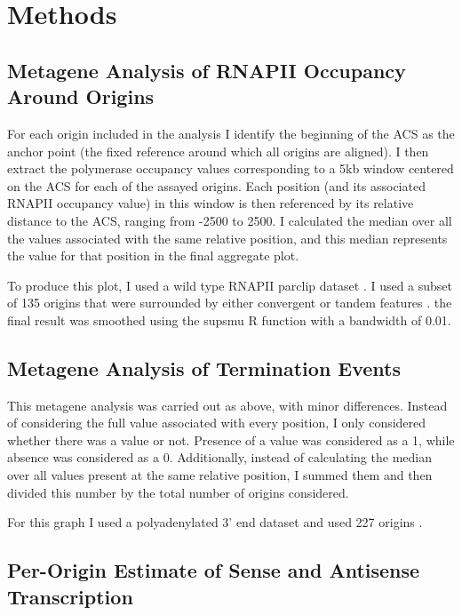 \chapter*{\textbf{Methods}}

\singlespacing
\section*{Metagene Analysis of RNAPII Occupancy Around Origins}
\doublespacing

For each origin included in the analysis I identify the beginning of the ACS as the anchor point (the fixed reference around which all origins are aligned). 
I then extract the polymerase occupancy values corresponding to a 5kb window centered on the ACS for each of the assayed origins. 
Each position (and its associated RNAPII occupancy value) in this window is then referenced by its relative distance to the ACS, ranging from -2500 to 2500. 
I calculated the median over all the values associated with the same relative position, and this median represents the value for that position in the final aggregate plot.

To produce this plot, I used a wild type RNAPII parclip dataset \cite{schaughency:2014:genomewide}. I used a subset of 135 origins \cite{nieduszynski:2006:genomewide} that were surrounded by either convergent or tandem features \cite{xu:2009:bidirectional}. the final result was smoothed using the supsmu R function \cite{rproject} with a bandwidth of 0.01.

\section*{Metagene Analysis of Termination Events}

This metagene analysis was carried out as above, with minor differences. Instead of considering the full value associated with every position, I only considered whether there was a value or not. Presence of a value was considered as a 1, while absence was considered as a 0. Additionally, instead of calculating the median over all values present at the same relative position, I summed them and then divided this number by the total number of origins considered.

For this graph I used a polyadenylated 3’ end dataset \cite{wilkening:2013:efficient} and used 227 origins \cite{nieduszynski:2006:genomewide}.

\section*{Per-Origin Estimate of Sense and Antisense Transcription}

